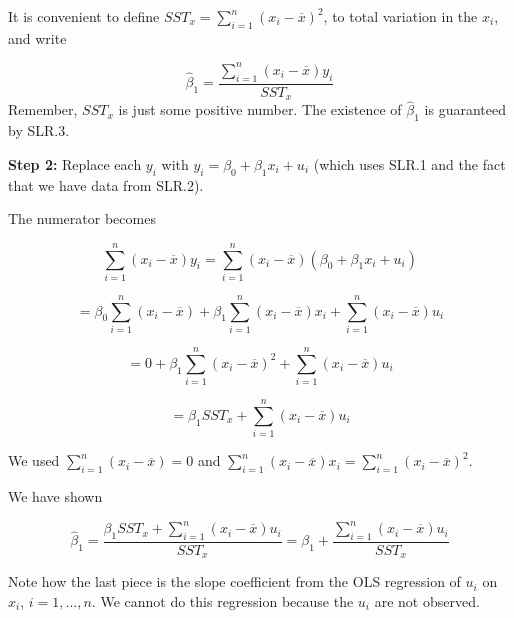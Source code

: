 \documentclass[notes=show]{beamer}
\begin{document}
\begin{frame}[plain]

 It is convenient to define $SST_{x}=\sum_{i=1}^{n}(x_{i}-\overline{x})^{2}$, to total variation in the $x_{i}$, and write

 \begin{equation}
  \hat{\beta}_{1}=\frac{\sum_{i=1}^{n}(x_{i}-\overline{x})y_{i}}{SST_{x}}
 \end{equation}
 Remember, $SST_{x}$ is just some positive number. The existence of $\hat{\beta}_{1}$ is guaranteed by SLR.3.\linebreak
 
 \textbf{Step 2:} Replace each $y_{i}$ with $y_{i}=\beta _{0}+\beta_{1}x_{i}+u_{i}$ (which uses SLR.1 and the fact that we have data from SLR.2).
\end{frame}

\begin{frame}[plain]

The numerator becomes

 \begin{equation}
  \sum_{i=1}^{n}(x_{i}-\overline{x})y_{i}=\sum_{i=1}^{n}(x_{i}-\overline{x})(\beta_{0}+\beta _{1}x_{i}+u_{i})
 \end{equation}
 
 \begin{equation}
  =\beta _{0}\sum_{i=1}^{n}(x_{i}-\overline{x})+\beta _{1}\sum_{i=1}^{n}(x_{i}-\overline{x})x_{i}+\sum_{i=1}^{n}(x_{i}-\overline{x})u_{i}
 \end{equation}
 
 \begin{equation}
  =0+\beta _{1}\sum_{i=1}^{n}(x_{i}-\overline{x})^{2}+\sum_{i=1}^{n}(x_{i}-\overline{x})u_{i}
 \end{equation}
 
 \begin{equation}
  =\beta _{1}SST_{x}+\sum_{i=1}^{n}(x_{i}-\overline{x})u_{i}
 \end{equation}
 
 We used $\sum_{i=1}^{n}(x_{i}-\overline{x})=0$ and $\sum_{i=1}^{n}(x_{i}-\overline{x})x_{i}=\sum_{i=1}^{n}(x_{i}-\overline{x})^{2}$.

\end{frame}

\begin{frame}[plain]

 We have shown

 \begin{equation}
\hat{\beta}_{1}=\frac{\beta_{1}SST_{x}+\sum_{i=1}^{n}(x_{i}-\overline{x})u_{i}}{SST_{x}}=\beta_{1}+\frac{\sum_{i=1}^{n}(x_{i}-\overline{x})u_{i}}{SST_{x}}
\end{equation}

 Note how the last piece is the slope coefficient from the OLS regression of $u_{i}$ on $x_{i}$, $i=1,...,n$. We cannot do this regression because the $u_{i}$ are not observed.
\end{frame}
\end{document}
